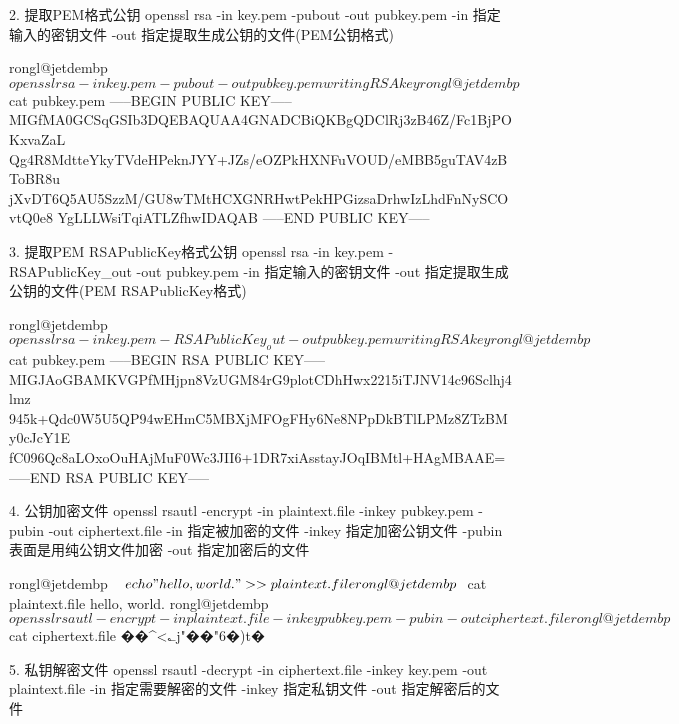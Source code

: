 2. 提取PEM格式公钥
openssl rsa -in key.pem -pubout -out pubkey.pem
    -in 指定输入的密钥文件
    -out 指定提取生成公钥的文件(PEM公钥格式)

    rongl@jetdembp ~ $ openssl rsa -in key.pem -pubout -out pubkey.pem
    writing RSA key
    rongl@jetdembp ~ $ cat pubkey.pem
    -----BEGIN PUBLIC KEY-----
    MIGfMA0GCSqGSIb3DQEBAQUAA4GNADCBiQKBgQDClRj3zB46Z/Fc1BjPOKxvaZaL
    Qg4R8MdtteYkyTVdeHPeknJYY+JZs/eOZPkHXNFuVOUD/eMBB5guTAV4zBToBR8u
    jXvDT6Q5AU5SzzM/GU8wTMtHCXGNRHwtPekHPGizsaDrhwIzLhdFnNySCOvtQ0e8
    YgLLLWsiTqiATLZfhwIDAQAB
    -----END PUBLIC KEY-----


3. 提取PEM RSAPublicKey格式公钥
openssl rsa -in key.pem -RSAPublicKey_out -out pubkey.pem
    -in 指定输入的密钥文件
    -out 指定提取生成公钥的文件(PEM RSAPublicKey格式)

    rongl@jetdembp ~ $ openssl rsa -in key.pem -RSAPublicKey_out -out pubkey.pem
    writing RSA key
    rongl@jetdembp ~ $ cat pubkey.pem
    -----BEGIN RSA PUBLIC KEY-----
    MIGJAoGBAMKVGPfMHjpn8VzUGM84rG9plotCDhHwx2215iTJNV14c96Sclhj4lmz
    945k+Qdc0W5U5QP94wEHmC5MBXjMFOgFHy6Ne8NPpDkBTlLPMz8ZTzBMy0cJcY1E
    fC096Qc8aLOxoOuHAjMuF0Wc3JII6+1DR7xiAsstayJOqIBMtl+HAgMBAAE=
    -----END RSA PUBLIC KEY-----


4. 公钥加密文件
openssl rsautl -encrypt -in plaintext.file -inkey pubkey.pem -pubin -out ciphertext.file
    -in 指定被加密的文件
    -inkey 指定加密公钥文件
    -pubin 表面是用纯公钥文件加密
    -out 指定加密后的文件

    rongl@jetdembp ~ $ echo "hello, world." >> plaintext.file
    rongl@jetdembp ~ $ cat plaintext.file
    hello, world.
    rongl@jetdembp ~ $ openssl rsautl -encrypt -in plaintext.file -inkey pubkey.pem -pubin -out ciphertext.file
    rongl@jetdembp ~ $ cat ciphertext.file
    ��^<؎j"��"6�)t�%


5. 私钥解密文件
openssl rsautl -decrypt -in ciphertext.file -inkey key.pem -out plaintext.file
    -in 指定需要解密的文件
    -inkey 指定私钥文件
    -out 指定解密后的文件

